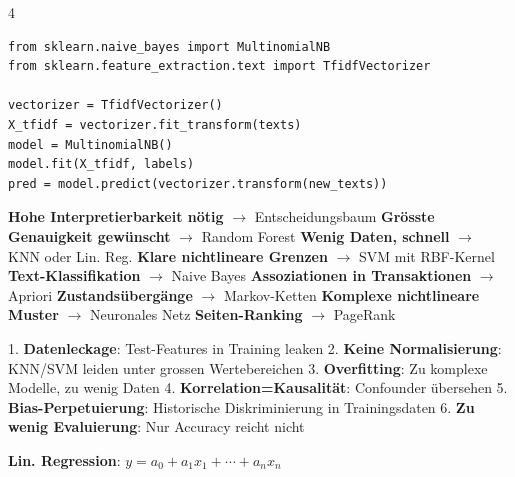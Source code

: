 \begin{landscape}
\begin{multicols*}{4}

		\begin{cheatSheetBox}[title=Naive Bayes Classifier]
			\begin{lstlisting}
from sklearn.naive_bayes import MultinomialNB
from sklearn.feature_extraction.text import TfidfVectorizer

vectorizer = TfidfVectorizer()
X_tfidf = vectorizer.fit_transform(texts)
model = MultinomialNB()
model.fit(X_tfidf, labels)
pred = model.predict(vectorizer.transform(new_texts))
			\end{lstlisting}
		\end{cheatSheetBox}


		\begin{cheatSheetBox}[title=Algorithmus-Wahl nach Szenario]
			\textbf{Hohe Interpretierbarkeit nötig} $\rightarrow$ Entscheidungsbaum
			\textbf{Grösste Genauigkeit gewünscht} $\rightarrow$ Random Forest
			\textbf{Wenig Daten, schnell} $\rightarrow$ KNN oder Lin. Reg.
			\textbf{Klare nichtlineare Grenzen} $\rightarrow$ SVM mit RBF-Kernel
			\textbf{Text-Klassifikation} $\rightarrow$ Naive Bayes
			\textbf{Assoziationen in Transaktionen} $\rightarrow$ Apriori
			\textbf{Zustandsübergänge} $\rightarrow$ Markov-Ketten
			\textbf{Komplexe nichtlineare Muster} $\rightarrow$ Neuronales Netz
			\textbf{Seiten-Ranking} $\rightarrow$ PageRank
		\end{cheatSheetBox}


		\begin{cheatSheetBox}[title=Fehler]
			1. \textbf{Datenleckage}: Test-Features in Training leaken
			2. \textbf{Keine Normalisierung}: KNN/SVM leiden unter grossen Wertebereichen
			3. \textbf{Overfitting}: Zu komplexe Modelle, zu wenig Daten
			4. \textbf{Korrelation=Kausalität}: Confounder übersehen
			5. \textbf{Bias-Perpetuierung}: Historische Diskriminierung in Trainingsdaten
			6. \textbf{Zu wenig Evaluierung}: Nur Accuracy reicht nicht
		\end{cheatSheetBox}


		\begin{cheatSheetBox}[title=Zentrale Formeln]
			\textbf{Lin. Regression}:
			$y = a_0 + a_1x_1 + \cdots + a_nx_n$


\end{cheatSheetBox}
\end{multicols*}
\end{landscape}
